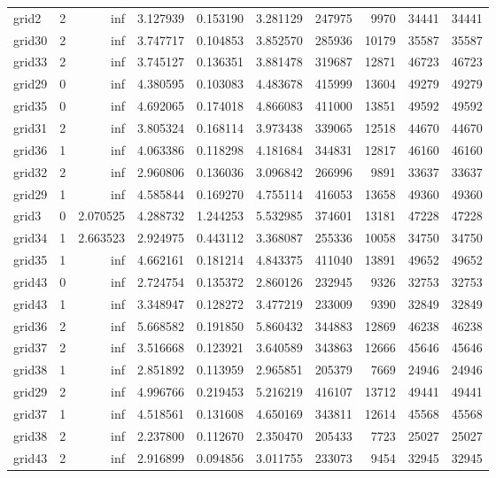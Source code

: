 \begin{longtable}{|l|r|r|r|r|r|r|r|r|r|}
grid2 & 2 & inf & 3.127939 & 0.153190 & 3.281129 & 247975 & 9970 & 34441 & 34441 \\
grid30 & 2 & inf & 3.747717 & 0.104853 & 3.852570 & 285936 & 10179 & 35587 & 35587 \\
grid33 & 2 & inf & 3.745127 & 0.136351 & 3.881478 & 319687 & 12871 & 46723 & 46723 \\
grid29 & 0 & inf & 4.380595 & 0.103083 & 4.483678 & 415999 & 13604 & 49279 & 49279 \\
grid35 & 0 & inf & 4.692065 & 0.174018 & 4.866083 & 411000 & 13851 & 49592 & 49592 \\
grid31 & 2 & inf & 3.805324 & 0.168114 & 3.973438 & 339065 & 12518 & 44670 & 44670 \\
grid36 & 1 & inf & 4.063386 & 0.118298 & 4.181684 & 344831 & 12817 & 46160 & 46160 \\
grid32 & 2 & inf & 2.960806 & 0.136036 & 3.096842 & 266996 & 9891 & 33637 & 33637 \\
grid29 & 1 & inf & 4.585844 & 0.169270 & 4.755114 & 416053 & 13658 & 49360 & 49360 \\
grid3 & 0 & 2.070525 & 4.288732 & 1.244253 & 5.532985 & 374601 & 13181 & 47228 & 47228 \\
grid34 & 1 & 2.663523 & 2.924975 & 0.443112 & 3.368087 & 255336 & 10058 & 34750 & 34750 \\
grid35 & 1 & inf & 4.662161 & 0.181214 & 4.843375 & 411040 & 13891 & 49652 & 49652 \\
grid43 & 0 & inf & 2.724754 & 0.135372 & 2.860126 & 232945 & 9326 & 32753 & 32753 \\
grid43 & 1 & inf & 3.348947 & 0.128272 & 3.477219 & 233009 & 9390 & 32849 & 32849 \\
grid36 & 2 & inf & 5.668582 & 0.191850 & 5.860432 & 344883 & 12869 & 46238 & 46238 \\
grid37 & 2 & inf & 3.516668 & 0.123921 & 3.640589 & 343863 & 12666 & 45646 & 45646 \\
grid38 & 1 & inf & 2.851892 & 0.113959 & 2.965851 & 205379 & 7669 & 24946 & 24946 \\
grid29 & 2 & inf & 4.996766 & 0.219453 & 5.216219 & 416107 & 13712 & 49441 & 49441 \\
grid37 & 1 & inf & 4.518561 & 0.131608 & 4.650169 & 343811 & 12614 & 45568 & 45568 \\
grid38 & 2 & inf & 2.237800 & 0.112670 & 2.350470 & 205433 & 7723 & 25027 & 25027 \\
grid43 & 2 & inf & 2.916899 & 0.094856 & 3.011755 & 233073 & 9454 & 32945 & 32945 \\

\end{longtable}
